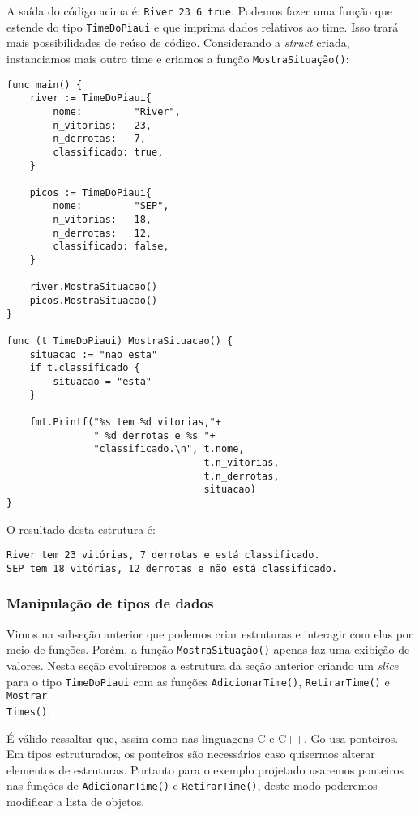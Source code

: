 \documentclass{SBCbookchapter}
\begin{document}
A saída do código acima é: \texttt{{River 23 6 true}}. Podemos fazer uma função que estende do tipo \texttt{TimeDoPiaui} e que imprima dados relativos ao time. Isso trará mais possibilidades de reúso de código. Considerando a \textit{struct} criada, instanciamos mais outro time e criamos a função \texttt{MostraSituação()}:

\begin{lstlisting}
func main() {
	river := TimeDoPiaui{
		nome:         "River",
		n_vitorias:   23,
		n_derrotas:   7,
		classificado: true,
	}

	picos := TimeDoPiaui{
		nome:         "SEP",
		n_vitorias:   18,
		n_derrotas:   12,
		classificado: false,
	}

	river.MostraSituacao()
	picos.MostraSituacao()
}

func (t TimeDoPiaui) MostraSituacao() {
	situacao := "nao esta"
	if t.classificado {
		situacao = "esta"
	}
	
	fmt.Printf("%s tem %d vitorias,"+
			   " %d derrotas e %s "+
		   	   "classificado.\n", t.nome,
								  t.n_vitorias,
								  t.n_derrotas,
								  situacao)
}

\end{lstlisting}

O resultado desta estrutura é:

\noindent\texttt{River tem 23 vitórias, 7 derrotas e está classificado.}\\
\texttt{SEP tem 18 vitórias, 12 derrotas e não está classificado.}

\subsubsection{Manipulação de tipos de dados}

Vimos na subseção anterior que podemos criar estruturas e interagir com elas por meio de funções. Porém, a função \texttt{MostraSituação()} apenas faz uma exibição de valores. Nesta seção evoluiremos a estrutura da seção anterior criando um \textit{slice} para o tipo \texttt{TimeDoPiaui} com as funções \texttt{AdicionarTime()}, \texttt{RetirarTime()} e \texttt{Mostrar\\Times()}. 

É válido ressaltar que, assim como nas linguagens C e C++, Go usa ponteiros. Em tipos estruturados, os ponteiros são necessários caso quisermos alterar elementos de estruturas. Portanto para o exemplo projetado usaremos ponteiros nas funções de \texttt{AdicionarTime()} e \texttt{RetirarTime()}, deste modo poderemos modificar a lista de objetos.
\end{document}

